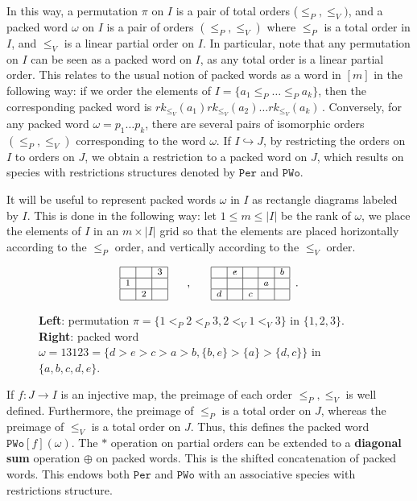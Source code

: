 \documentclass[submission]{FPSAC2023}
\theoremstyle{definition}
\begin{document}
In this way, a permutation $\pi$ on $I$ is a pair of total orders ($\leq_P, \leq_V)$, and a packed word $\omega$ on $I$ is a pair of orders $(\leq_P, \leq_V)$ where $\leq_P$ is a total order in $I$, and $\leq_V$ is a linear partial order on $I$.
In particular, note that any permutation on $I$ can be seen as a packed word on $I$, as any total order is a linear partial order.
This relates to the usual notion of packed words as a word in $[m]$ in the following way:
if we order the elements of $I = \{a_1 \leq_P \dots \leq_P a_k \}$, then the corresponding packed word is $rk_{\leq_V}(a_1)rk_{\leq_V}(a_2) \dots rk_{\leq_V}(a_k) \, $. Conversely, for any packed word $\omega = p_1\dots p_k$, there are several pairs of isomorphic orders $(\leq_P, \leq_V)$ corresponding to the word $\omega$. If $I \hookrightarrow J$, by restricting the orders on $I$ to orders on $J$, we obtain a restriction to a packed word on $J$, which results on species with restrictions structures denoted by $\mathtt{Per}$ and $\mathtt{PWo}$.

It will be useful to represent packed words $\omega $ in $I$ as rectangle diagrams labeled by $I$.
This is done in the following way: let $1\leq m \leq |I|$ be the rank of $\omega$, we place the elements of $I$ in an $m \times |I|$ grid so that the elements are placed horizontally according to the $\leq_P$ order, and vertically according to the $\leq_V$ order.
\begin{figure}[h]
\[\footnotesize{
\begin{array}{|c|c|c|}
	\hline & & 3 \\
    \hline 1 & &  \\
    \hline & 2 & \\
    \hline 
\end{array} \qquad , \qquad 
\begin{array}{|c|c|c|c|c|}
	\hline   & e &   &   & b \\
    \hline   &   &   & a &   \\
    \hline d &   & c &   &   \\
    \hline 
\end{array}}\, \, \, .\]
\caption{{\bf Left}: permutation $\pi = \{1<_P2<_P3 , 2<_V1<_V3\}$ in $\{1, 2, 3\}$. {\bf Right}: packed word $\omega = 13123 = \{ d > e > c > a > b, \{b, e\} > \{a\} > \{d, c\}\}$ in $\{a, b, c, d, e\}$.}
\end{figure}


If $f:J \to I $ is an injective map, the preimage of each order $\leq_P, \leq_V$ is well defined.
Furthermore, the preimage of $\leq_P$ is a total order on $J$, whereas the preimage of $\leq_V$ is a total order on $J$.
Thus, this defines the packed word $\mathtt{PWo}[f](\omega )$.
The $\ast $ operation on partial orders can be extended to a \textbf{diagonal sum} operation $\oplus $ on packed words.
This is the shifted concatenation of packed words.
This endows both $\mathtt{Per}$ and $\mathtt{PWo}$ with an associative species with restrictions structure.
\end{document}
